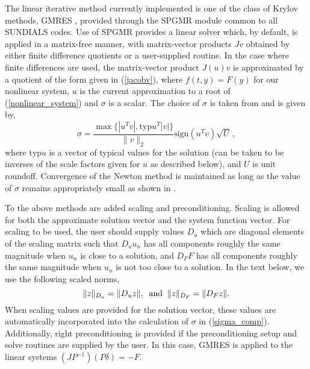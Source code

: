 The linear iterative method currently implemented is one of the class of 
Krylov methods, GMRES \cite{BrHi:89,SaSc:86}, 
provided through the SPGMR module common to all SUNDIALS codes. 
Use of SPGMR provides a linear solver which, by default, is applied in a 
matrix-free manner, with matrix-vector products $Jv$ obtained by either 
finite difference quotients or a user-supplied routine.
In the case where finite differences are used, 
the matrix-vector product $J(u)v$ is approximated by a quotient of the form
given in (\ref{jacobv}),
where $f(t, y) = F(y)$ for our nonlinear system, 
$u$ is the current approximation to a root of (\ref{nonlinear_system}) 
and $\sigma$ is a scalar.  The choice of $\sigma$ is taken from 
\cite{BrSa:90} and is given by,
\begin{equation}\label{sigma_comp}
  \sigma = \frac{\max \{|u^T v|, \mbox{typ}u^T |v|\}}{\|v\|_2} 
  \mbox{sign}(u^T v) \sqrt{U} \, ,
\end{equation}
where $\mbox{typ}u$ is a vector of typical values for the solution (can be 
taken to be inverses of the scale factors given for $u$ as described 
below), and $U$ is unit roundoff.
Convergence of the Newton method is maintained as long as the value
of $\sigma$ remains appropriately small as shown in \cite{Bro:87}.

To the above methods are added scaling and preconditioning. Scaling is allowed
for both the approximate solution vector and the system function vector.
For scaling to be used, the user should supply values $D_u$ which
are diagonal elements of the scaling matrix such that $D_u u_n$ has all
components roughly the same magnitude when $u_n$ is close to a solution,
and $D_F F$ has all components roughly the same magnitude when $u_n$ is not
too close to a solution.
In the text below, we use the following scaled norms,
\begin{equation}
\|z\|_{D_u} = \|D_u z\|, \;\; {\rm and} \;\; \|z\|_{D_F} = \|D_F z\|.
\end{equation}
When scaling values are provided for the solution vector, these values are 
automatically incorporated into the calculation of $\sigma$ in
(\ref{sigma_comp}).
Additionally, right preconditioning is provided if the preconditioning 
setup and solve routines are supplied by the user.  In this case,
GMRES is applied to the linear systems $(JP^{-1})(P\delta) = -F$.

